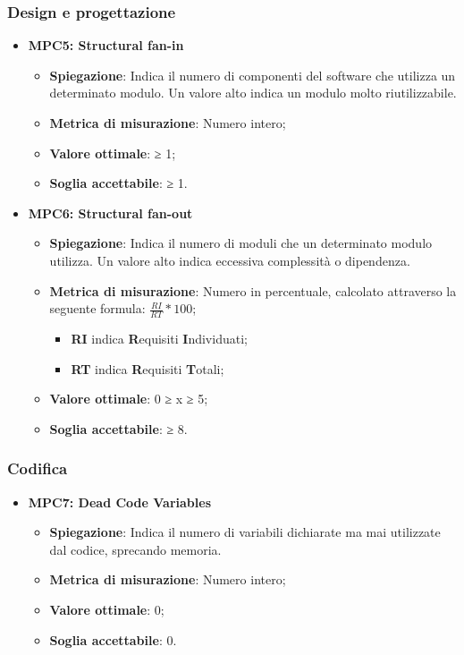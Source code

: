 \subsubsection{Design e progettazione}
\begin{itemize}
    \item \textbf{MPC5: Structural fan-in}
    \begin{itemize}
        \item \textbf{Spiegazione}: Indica il numero di componenti del software che utilizza un determinato modulo. Un valore alto indica un modulo molto riutilizzabile.
        \item \textbf{Metrica di misurazione}: Numero intero;
        \item \textbf{Valore ottimale}: ≥ 1;
        \item \textbf{Soglia accettabile}: ≥ 1.
    \end{itemize}
    \item \textbf{MPC6: Structural fan-out}
    \begin{itemize}
        \item \textbf{Spiegazione}: Indica il numero di moduli che un determinato modulo utilizza. Un valore alto indica eccessiva complessità o dipendenza.
        \item \textbf{Metrica di misurazione}: Numero in percentuale, calcolato attraverso la seguente formula: \textbf{$\frac{RI}{RT} * 100$};
            \begin{itemize}
                \item \textbf{RI} indica \textbf{R}equisiti \textbf{I}ndividuati;
                \item \textbf{RT} indica \textbf{R}equisiti \textbf{T}otali;
            \end{itemize}
        \item \textbf{Valore ottimale}: 0 ≥ x ≥ 5; 
        \item \textbf{Soglia accettabile}: ≥ 8. %
    \end{itemize}
\end{itemize}

\subsubsection{Codifica}
\begin{itemize}
    \item \textbf{MPC7: Dead Code Variables}
    \begin{itemize}
        \item \textbf{Spiegazione}: Indica il numero di variabili dichiarate ma mai utilizzate dal codice, sprecando memoria.
        \item \textbf{Metrica di misurazione}: Numero intero;
        \item \textbf{Valore ottimale}: 0;
        \item \textbf{Soglia accettabile}: 0.
    \end{itemize}
\end{itemize}


